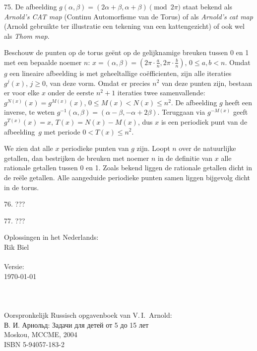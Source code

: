 \begin{problem}{75.}
    De afbeelding $g(\alpha,\beta) = (2 \alpha + \beta,\alpha + \beta) \pmod {2 \pi}$ staat bekend als \textit{Arnold's CAT map} (Continu Automorfisme van de Torus) of als \textit{Arnold's cat map} (Arnold gebruikte ter illustratie een tekening van een kattengezicht) of ook wel als \textit{Thom map}.

    Beschouw de punten op de torus geënt op de gelijknamige breuken tussen 0 en 1 met een bepaalde noemer $n$: $x = (\alpha,\beta) = \left( 2 \pi \cdot \frac{a}{n},2 \pi \cdot \frac{b}{n} \right)$, $0 \leq a,b < n$. Omdat $g$ een lineaire afbeelding is met geheeltallige coëfficienten, zijn alle iteraties $g^j(x)$, $j \geq 0$, van deze vorm. Omdat er precies $n^2$ van deze punten zijn, bestaan er voor elke $x$ onder de eerste $n^2 + 1$ iteraties twee samenvallende: $g^{N(x)}(x) = g^{M(x)}(x)$, \mbox{$0 \leq M(x) < N(x) \leq n^2$}. De afbeelding $g$ heeft een inverse, te weten $g^{-1}(\alpha,\beta) = (\alpha - \beta,-\alpha + 2 \beta)$. Teruggaan via $g^{-M(x)}$ geeft $g^{T(x)}(x) = x$, $T(x) = N(x) - M(x)$, dus $x$ is een periodiek punt van de afbeelding~$g$ met periode $0 < T(x) \leq n^2$.

    We zien dat alle $x$ periodieke punten van $g$ zijn. Loopt $n$ over de natuurlijke getallen, dan bestrijken de breuken met noemer $n$ in de definitie van $x$ alle rationale getallen tussen 0 en 1. Zoals bekend liggen de rationale getallen dicht in de reële getallen. Alle aangeduide periodieke punten samen liggen bijgevolg dicht in de torus.
\end{problem}

\begin{problem}{76.}
	???
\end{problem}

\begin{problem}{77.}
	???
\end{problem}

\clearpage

\null\vfill
\noindent
Oplossingen in het Nederlands:\\
\null\quad Rik Biel\\
\\
Versie:\\
\null\quad \today\\
\\
\\
\\
Oorspronkelijk Russisch opgavenboek van V.\,I.~Arnold:\\
\null\quad \textrussian{В. И. Арнольд: Задачи для детей от 5 до 15 лет}\\
\null\quad Moskou, MCCME, 2004\\
\null\quad ISBN 5-94057-183-2


